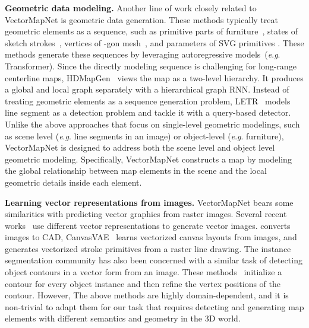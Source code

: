 \documentclass{article}
\newcommand{\eg}{\textit{e}.\textit{g}. }
\theoremstyle{plain}
\theoremstyle{definition}
\theoremstyle{remark}
\begin{document}
\noindent\textbf{Geometric data modeling.}
Another line of work closely related to VectorMapNet is geometric data generation. These methods typically treat geometric elements as a sequence, such as primitive parts of furniture~\citep{li2017grass,mo2019structurenet}, states of sketch strokes~\citep{ha2017neural}, vertices of -gon mesh~\citep{nash2020polygen}, and parameters of SVG primitives \citep{carlier2020deepsvg}.
These methods generate these sequences by leveraging autoregressive models~(\eg Transformer). 
Since the directly modeling sequence is challenging for long-range centerline maps, HDMapGen~\citep{mi2021hdmapgen} views the map as a two-level hierarchy. 
It produces a global and local graph separately with a hierarchical graph RNN. Instead of treating geometric elements as a sequence generation problem, LETR~\citep{xu2021line} models line segment as a detection problem and tackle it with a query-based detector. 
Unlike the above approaches that focus on single-level geometric modelings, such as scene level (\eg line segments in an image) or object-level (\eg furniture), VectorMapNet is designed to address both the scene level and object level geometric modeling. Specifically, VectorMapNet constructs a map by modeling the global relationship between map elements in the scene and the local geometric details inside each element.

\noindent\textbf{Learning vector representations from images.}
VectorMapNet bears some similarities with predicting vector graphics from raster images. Several recent works~\citep{carlier2020deepsvg,reddy2021im2vec} use different vector representations to generate vector images. \citep{ganin2021computer} converts images to CAD, CanvasVAE~\citep{yamaguchi2021canvasvae} learns vectorized canvas layouts from images, and \citep{liu2022end} generates vectorized stroke primitives from a raster line drawing.
The instance segmentation community has also been concerned with a similar task of detecting object contours in a vector form from an image. These methods~\citep{acuna2018efficient,liang2020polytransform,castrejon2017annotating,zorzi2022polyworld,zhang2019jointnet} initialize a contour for every object instance and then refine the vertex positions of the contour.
However, The above methods are highly domain-dependent, and it is non-trivial to adapt them for our task that requires detecting and generating map elements with different semantics and geometry in the 3D world. 
\end{document}
